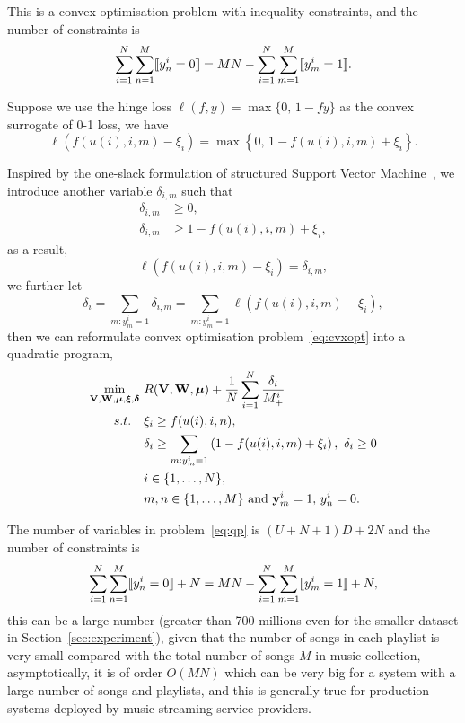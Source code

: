 This is a convex optimisation problem with inequality constraints, 
and the number of constraints is 
$$
\sum_{i=1}^N \sum_{n=1}^M \llbracket y_n^i = 0 \rrbracket = MN - \sum_{i=1}^N \sum_{m=1}^M \llbracket y_m^i = 1 \rrbracket.
$$

Suppose we use the hinge loss $\ell(f, y) = \max \{ 0, \, 1 - fy \}$ as the convex surrogate of 0-1 loss, we have
\begin{equation*}
\ell \left( f(u(i), i, m) - \xi_i \right) = \max \left\{ 0, \, 1 - f( u(i), i, m) + \xi_i \right\}.
\end{equation*}

Inspired by the one-slack formulation of structured Support Vector Machine~\cite{joachims2009cutting}, 
we introduce another variable $\delta_{i,m}$ such that
\begin{equation*}
\begin{aligned}
\delta_{i,m} & \ge 0, \\
\delta_{i,m} & \ge 1 - f( u(i), i, m) + \xi_i, 
\end{aligned}
\end{equation*}
as a result,
\begin{equation*}
\ell \left( f(u(i), i, m) - \xi_i \right) = \delta_{i,m},
\end{equation*}
we further let
\begin{equation*}
\delta_i = \sum_{m: y_m^i = 1} \delta_{i,m} = \sum_{m: y_m^i = 1} \ell \left( f(u(i), i, m) - \xi_i \right),
\end{equation*}
then we can reformulate convex optimisation problem~\ref{eq:cvxopt} into a quadratic program,
\begin{equation}
\label{eq:qp}
\begin{aligned}
\min_{\mathbf{V}, \mathbf{W}, \bm{\mu}, \bm{\xi}, {\bm{\delta}}} \ & R(\mathbf{V}, \mathbf{W}, \bm{\mu}) + \frac{1}{N} \sum_{i=1}^N \frac{\delta_i}{M_+^i} \\
s.t. \quad 
& \xi_i \ge f(u(i), i, n), \\
& \delta_i \ge \sum_{m: y_m^i = 1} \left( 1 - f( u(i), i, m) + \xi_i \right), \ \delta_i \ge 0 \\
& i \in \{1,\dots,N\}, \\
& m, n \in \{1,\dots,M\} \ \mathrm{and} \ \mathbf{y}_m^i = 1, \,  y_n^i = 0. 
\end{aligned}
\end{equation}

The number of variables in problem~\ref{eq:qp} is $(U + N + 1) D + 2N$ and the number of constraints is
$$
\sum_{i=1}^N \sum_{n=1}^M \llbracket y_n^i = 0 \rrbracket + N = MN - \sum_{i=1}^N \sum_{m=1}^M \llbracket y_m^i = 1 \rrbracket + N,
$$
%
this can be a large number (\eg greater than 700 millions even for the smaller dataset in Section~\ref{sec:experiment}),
given that the number of songs in each playlist is very small compared with the total number of songs $M$ in music collection,
asymptotically, it is of order $O(MN)$ which can be very big for a system with a large number of songs and playlists,
and this is generally true for production systems deployed by music streaming service providers.

